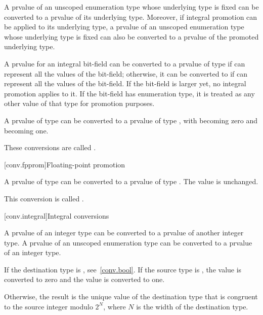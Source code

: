 \pnum
A prvalue of an unscoped enumeration type whose underlying type is
fixed can be converted to a prvalue of its underlying type. Moreover,
if integral promotion can be applied to its underlying type, a prvalue of an unscoped
enumeration type whose underlying type is fixed can also be converted to a prvalue of
the promoted underlying type.

\pnum
A prvalue for an integral bit-field can be converted
to a prvalue of type  if  can represent all the
values of the bit-field; otherwise, it can be converted to
 if  can represent all the
values of the bit-field. If the bit-field is larger yet, no integral
promotion applies to it. If the bit-field has enumeration type, it is
treated as any other value of that type for promotion purposes.

\pnum
{}%
A prvalue of type  can be converted to a prvalue of type
, with  becoming zero and  becoming
one.

\pnum
These conversions are called .

[conv.fpprom]{Floating-point promotion}

\pnum
{}%
A prvalue of type  can be converted to a prvalue of type
. The value is unchanged.

\pnum
This conversion is called .

[conv.integral]{Integral conversions}

\pnum
{}%
A prvalue of an integer type can be converted to a prvalue of another
integer type. A prvalue of an unscoped enumeration type can be converted to
a prvalue of an integer type.

\pnum
{}%
If the destination type is , see~\ref{conv.bool}. If the
source type is , the value  is converted to
zero and the value  is converted to one.

\pnum
{}%
%
Otherwise, the result is the unique value of the destination type
that is congruent to the source integer modulo $2^N$,
where $N$ is the width of the destination type.


